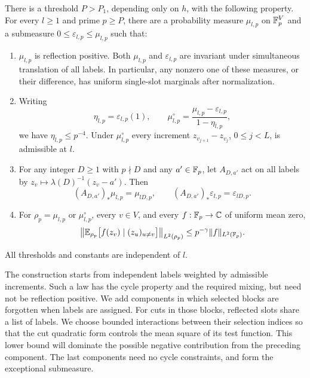 \begin{proposition}\label{prop:tuple-laws}
There is a threshold $P>P_1$, depending only on $h$, with the following
property.  For every $l\ge1$ and prime $p\ge P$, there are a probability
measure $\mu_{l,p}$ on $\mathbb F_p^V$ and a submeasure
$0\le\varepsilon_{l,p}\le\mu_{l,p}$ such that:
\begin{enumerate}
\item $\mu_{l,p}$ is reflection positive.  Both $\mu_{l,p}$ and
$\varepsilon_{l,p}$ are invariant under simultaneous translation of all
labels.  In particular, any nonzero one of these measures, or their
difference, has uniform single-slot marginals after normalization.
\item Writing
\[
 \eta_{l,p}=\varepsilon_{l,p}(1),\qquad
 \mu_{l,p}^{\circ}=\frac{\mu_{l,p}-\varepsilon_{l,p}}{1-\eta_{l,p}},
\]
we have $\eta_{l,p}\le p^{-4}$.  Under $\mu_{l,p}^{\circ}$ every
increment $z_{v_{j+1}}-z_{v_j}$, $0\le j<L$, is admissible at $l$.
\item For any integer $D\ge1$ with $p\nmid D$ and any
$a'\in\mathbb F_p$, let $A_{D,a'}$ act on all labels by
$z_v\mapsto\lambda(D)^{-1}(z_v-a')$.  Then
\begin{equation}\label{eq:tuple-covariance}
 (A_{D,a'})_*\mu_{l,p}=\mu_{lD,p},\qquad
 (A_{D,a'})_*\varepsilon_{l,p}=\varepsilon_{lD,p}.
\end{equation}
\item For $\rho_p=\mu_{l,p}$ or $\mu_{l,p}^{\circ}$, every
$v\in V$, and every $f:\mathbb F_p\to\mathbb C$ of uniform mean zero,
\begin{equation}\label{eq:tuple-mixing}
 \left\|\mathbb E_{\rho_p}
   \bigl[f(z_v)\mid(z_u)_{u\ne v}\bigr]\right\|_{L^2(\rho_p)}
 \le p^{-\gamma}\|f\|_{L^2(\mathbb F_p)}.
\end{equation}
\end{enumerate}
All thresholds and constants are independent of $l$.
\end{proposition}

The construction starts from independent labels weighted by admissible
increments.  Such a law has the cycle property and the required mixing,
but need not be reflection positive.  We add components in which selected
blocks are forgotten when labels are assigned.  For cuts in those blocks,
reflected slots share a list of labels.  We choose bounded interactions
between their selection indices so that the cut quadratic form controls
the mean square of its test function.  This lower bound will dominate the possible
negative contribution from the preceding component.
The last components need no cycle constraints, and form the exceptional
submeasure.

